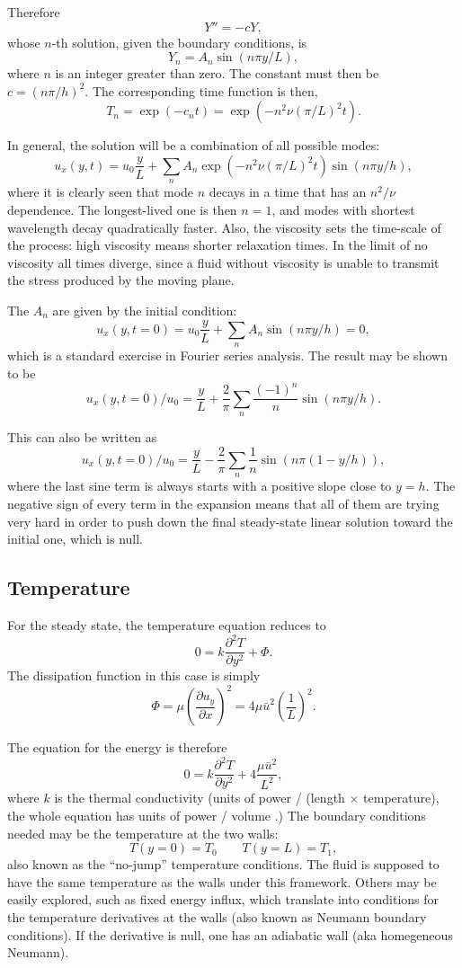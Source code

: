 Therefore
\[
Y''= - c Y ,
\]
whose $n$-th solution, given the boundary conditions, is
\[
Y_n= A_n \sin(n\pi y/L),
\]
where $n$ is an integer greater than zero. The constant must then be
$c=(n\pi/h)^2$. The corresponding time function is then,
\[
T_n=\exp(-c_n t) = \exp(-  n^2 \nu (\pi/L)^2   t) .
\]

In general, the solution will be a combination of all possible modes:
\[
u_x(y,t) =  u_0 \frac{y}{L}
+ \sum_n A_n
\exp(-  n^2 \nu (\pi/L)^2   t)  \sin(n\pi y/h),
\]
where it is clearly seen that mode $n$ decays in a time that has an
$n^2 /\nu $ dependence. The longest-lived one is then $n=1$, and modes
with shortest wavelength decay quadratically faster. Also, the
viscosity sets the time-scale of the process: high viscosity means
shorter relaxation times. In the limit of no viscosity all times
diverge, since a fluid without viscosity is unable to transmit the
stress produced by the moving plane.

The $A_n$ are given by the initial condition:
\[
u_x(y,t=0) =  
u_0 \frac{y}{L}
+ \sum_n A_n \sin(n\pi y/h) = 0 ,
\]
which is a standard exercise in Fourier series analysis. The result
may be shown to be
\[
u_x(y,t=0) / u_0  =  
 \frac{y}{L}
+\frac{2}{\pi}
 \sum_n \frac{(-1)^n}{n} \sin(n\pi y/h)  .
\]

This can also be written as 
\[
u_x(y,t=0) / u_0  =  
 \frac{y}{L}
-\frac{2}{\pi}
 \sum_n \frac{1}{n} \sin(n\pi (1-y/h))  ,
\]
where the last sine term is always starts with a positive slope close to $y=h$.
The negative sign of every term in the expansion means that all of them are
trying very hard in order to push down the final steady-state linear solution
toward the initial one, which is null.



\subsection{Temperature}


For the steady state, the temperature equation reduces to
\[
0 = k  \frac{\partial^2 T}{\partial y^2} + \Phi  .
\]
The dissipation function in this case is simply
\[
\Phi =   \mu  \left( \frac{\partial u_y}{\partial x} \right)^2 =
4 \mu \bar{u}^2  \left(\frac{1}{L}  \right)^2 .
\]

The equation for the energy is therefore
\[
0 = k \frac{\partial^2 T}{\partial y^2} +
4  \frac{ \mu \bar{u}^2  }{L^2} ,
\]
where $k$ is the thermal conductivity (units of power / (length
$\times$ temperature), the whole equation has units of power / volume
.) The boundary conditions needed may be the temperature at the two
walls:
\[
T(y=0) = T_0 \qquad
T(y=L) = T_1 ,
\]
also known as the ``no-jump'' temperature conditions. The fluid is
supposed to have the same temperature as the walls under this
framework. Others may be easily explored, such as fixed energy influx,
which translate into conditions for the temperature derivatives at the
walls (also known as Neumann boundary conditions). If the derivative
is null, one has an adiabatic wall (aka homegeneous Neumann).

